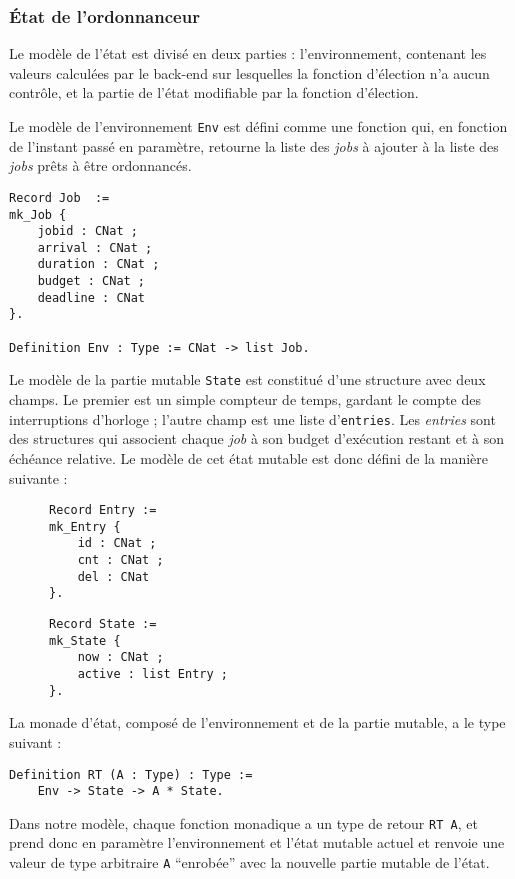 	\subsubsection{État de l'ordonnanceur}

	Le modèle de l'état est divisé en deux parties : l'environnement, contenant les valeurs calculées par le back-end sur lesquelles la fonction d'élection n'a aucun contrôle, et la partie de l'état modifiable par la fonction d'élection.

	Le modèle de l'environnement \texttt{Env} est défini comme une fonction qui, en fonction de l'instant passé en paramètre, retourne la liste des \emph{jobs} à ajouter à la liste des \emph{jobs} prêts à être ordonnancés.
	\begin{verbatim}
Record Job  :=
mk_Job {
    jobid : CNat ;
    arrival : CNat ;
    duration : CNat ;
    budget : CNat ;
    deadline : CNat
}.

Definition Env : Type := CNat -> list Job.
	\end{verbatim}

	Le modèle de la partie mutable \texttt{State} est constitué d'une structure avec deux champs. Le premier est un simple compteur de temps, gardant le compte des interruptions d'horloge ; l'autre champ est une liste d'\texttt{entries}. Les \emph{entries} sont des structures qui associent chaque \emph{job} à son budget d'exécution restant et à son échéance relative. Le modèle de cet état mutable est donc défini de la manière suivante :
\begin{figure}[ht]
\begin{minipage}[c]{0.50\linewidth}
\begin{verbatim}
Record Entry :=
mk_Entry {
    id : CNat ;
    cnt : CNat ;
    del : CNat
}.
\end{verbatim}
\end{minipage}
\begin{minipage}[c]{0.50\linewidth}
\begin{verbatim}
Record State :=                     
mk_State {                      
    now : CNat ;                 
    active : list Entry ;
}.

\end{verbatim}
\end{minipage}

\end{figure}

	La monade d'état, composé de l'environnement et de la partie mutable, a le type suivant :
	\begin{verbatim}
Definition RT (A : Type) : Type :=
    Env -> State -> A * State.
	\end{verbatim}
	Dans notre modèle, chaque fonction monadique a un type de retour \texttt{RT A}, et prend donc en paramètre l'environnement et l'état mutable actuel et renvoie une valeur de type arbitraire \texttt{A} ``enrobée'' avec la nouvelle partie mutable de l'état.

